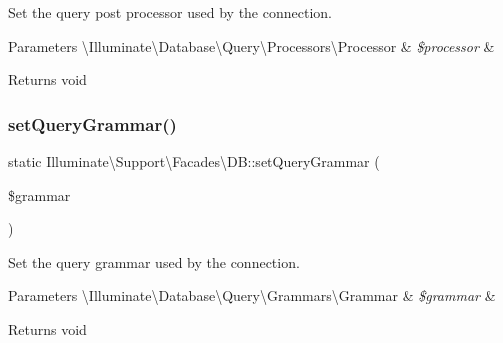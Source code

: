 Set the query post processor used by the connection.


\begin{DoxyParams}[1]{Parameters}
\textbackslash{}\+Illuminate\textbackslash{}\+Database\textbackslash{}\+Query\textbackslash{}\+Processors\textbackslash{}\+Processor & {\em \$processor} & \\
\hline
\end{DoxyParams}
\begin{DoxyReturn}{Returns}
void 
\end{DoxyReturn}
\mbox{\label{class_illuminate_1_1_support_1_1_facades_1_1_d_b_a0ad919b9b783e4aca37c6a10f9c04f6d}} 
\subsubsection{\texorpdfstring{set\+Query\+Grammar()}{setQueryGrammar()}}
{\footnotesize\ttfamily static Illuminate\textbackslash{}\+Support\textbackslash{}\+Facades\textbackslash{}\+D\+B\+::set\+Query\+Grammar (\begin{DoxyParamCaption}\item[{}]{\$grammar }\end{DoxyParamCaption})\hspace{0.3cm}{\ttfamily [static]}}

Set the query grammar used by the connection.


\begin{DoxyParams}[1]{Parameters}
\textbackslash{}\+Illuminate\textbackslash{}\+Database\textbackslash{}\+Query\textbackslash{}\+Grammars\textbackslash{}\+Grammar & {\em \$grammar} & \\
\hline
\end{DoxyParams}
\begin{DoxyReturn}{Returns}
void 
\end{DoxyReturn}
\mbox{\label{class_illuminate_1_1_support_1_1_facades_1_1_d_b_a2cb0be42acf9aa04a85a4064c4555e95}} 
